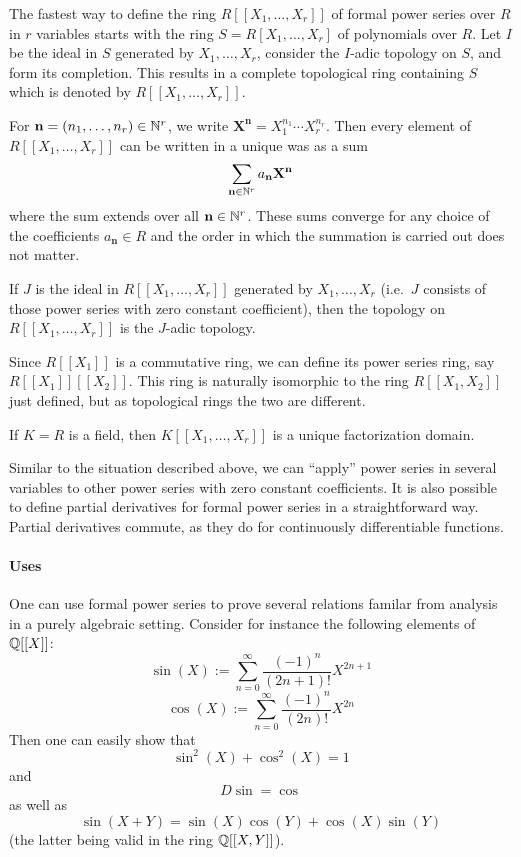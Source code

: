 \documentclass[12pt]{article}
\begin{document}
The fastest way to define the ring $R[[X_1,\ldots,X_r]]$ of formal power
series over $R$ in $r$ variables starts with the ring $S =
R[X_1,\ldots,X_r]$ of polynomials over $R$. Let $I$ be the ideal in $S$
generated by $X_1,\ldots,X_r$, consider the $I$-adic topology on $S$, and
form its completion. This results in a complete topological ring
containing $S$ which is denoted by $R[[X_1,\ldots,X_r]]$. 

For $\mathbf{n}=(n_1,\ldots,n_r)\in\Bbb{N}^r$, we write
$\mathbf{X}^\mathbf{n} = X_1^{n_1}\cdots X_r^{n_r}$. Then every element of
$R[[X_1,\ldots,X_r]]$ can be written in a unique was as a sum
$$\sum_{\mathbf{n}\in\Bbb{N}^r} a_{\mathbf{n}} \mathbf{X}^\mathbf{n}$$
where the sum extends over all $\mathbf{n}\in\Bbb{N}^r$.  These sums converge
for any choice of the coefficients $ a_{\mathbf{n}}\in R$ and the order
in which the summation is carried out does not matter.

If $J$ is the ideal in $R[[X_1,\ldots,X_r]]$ generated by $X_1,\ldots,X_r$
(i.e.\ $J$ consists of those power series with zero constant
coefficient), then the topology on $R[[X_1,\ldots,X_r]]$ is the $J$-adic
topology.

Since $R[[X_1]]$ is a commutative ring, we can define its power
series ring, say $R[[X_1]][[X_2]]$. This ring is naturally isomorphic to
the ring $R[[X_1,X_2]]$ just defined, but as topological rings the two
are different.

If $K=R$ is a field, then $K[[X_1,\ldots,X_r]]$ is a unique factorization
domain.

Similar to the situation described above, we can ``apply'' power
series in several variables to other power series with zero constant
coefficients. It is also possible to define partial derivatives for
formal power series in a straightforward way. Partial derivatives
commute, as they do for continuously differentiable functions.

\paragraph{Uses}

One can use formal power series to prove several relations familar
from analysis in a purely algebraic setting. Consider for instance the
following elements of $\Bbb{Q}[[X]]$:
$$\operatorname{sin}(X) := \sum_{n=0}^\infty \frac{(-1)^n}{(2n+1)!} X^{2n+1}$$
$$\operatorname{cos}(X) := \sum_{n=0}^\infty \frac{(-1)^n}{(2n)!} X^{2n}$$
Then one can easily show that
$$ \operatorname{sin}^2(X) + \operatorname{cos}^2(X) = 1$$
and
$$ D \operatorname{sin} = \operatorname{cos}$$
as well as
$$ \operatorname{sin}(X+Y) =
\operatorname{sin}(X)\operatorname{cos}(Y) +
\operatorname{cos}(X)\operatorname{sin}(Y)
$$
(the latter being valid in the ring $\Bbb{Q}[[X,Y]]$).
\end{document}
